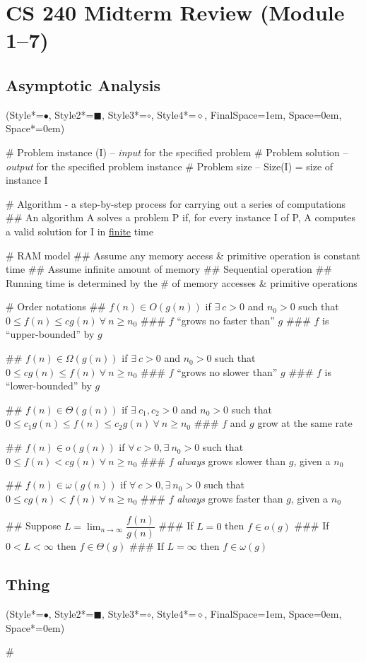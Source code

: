 \documentclass[11pt, oneside]{article}
\newcommand*{\begineasylist}{\begin{easylist}[itemize]\ListProperties(Style*=$\bullet$\quad, Style2*=\tiny$\blacksquare$\quad, Style3*=$\circ$\quad, Style4*=$\diamond$\quad, FinalSpace=1em, Space=0em, Space*=0em)}
\begin{document}
\section*{CS 240 Midterm Review (Module 1--7)}

\subsection*{Asymptotic Analysis}
\begineasylist

# Problem instance (I) -- \emph{input} for the specified problem
# Problem solution -- \emph{output} for the specified problem instance
# Problem size -- Size(I) = size of instance I

# Algorithm - a step-by-step process for carrying out a series of computations
## An algorithm A solves a problem P if, for every instance I of P, A computes a valid solution for I in \underline{finite} time

# RAM model
## Assume any memory access \& primitive operation is constant time
## Assume infinite amount of memory
## Sequential operation
## Running time is determined by the \# of memory accesses \& primitive operations

# Order notations
## \underline{$f(n) \in O(g(n))$} if $\exists \ c > 0$ and $n_0 > 0$ such that $0 \leq f(n) \leq cg(n) \ \forall \ n \geq n_0$
### $f$ ``grows no faster than'' $g$
### $f$ is ``upper-bounded'' by $g$

## \underline{$f(n) \in \Omega(g(n))$} if $\exists \ c > 0$ and $n_0 > 0$ such that $0 \leq cg(n) \leq f(n) \ \forall \ n \geq n_0$
### $f$ ``grows no slower than'' $g$
### $f$ is ``lower-bounded'' by $g$

## \underline{$f(n) \in \Theta(g(n))$} if $\exists \ c_1, c_2 > 0$ and $n_0 > 0$ such that $0 \leq c_1g(n) \leq f(n) \leq c_2g(n) \ \forall \ n \geq n_0$
### $f$ and $g$ grow at the same rate

## \underline{$f(n) \in o(g(n))$} if $\forall \ c > 0, \exists \ n_0 > 0$ such that $0 \leq f(n) < cg(n) \ \forall \ n \geq n_0$
### $f$ \emph{always} grows slower than $g$, given a $n_0$

## \underline{$f(n) \in \omega(g(n))$} if $\forall \ c > 0, \exists \ n_0 > 0$ such that $0 \leq cg(n) < f(n) \ \forall \ n \geq n_0$  
### $f$ \emph{always} grows faster than $g$, given a $n_0$

## Suppose $L = \lim_{n \rightarrow \infty} \dfrac{f(n)}{g(n)}$
### If $L = 0$ then $f \in o(g)$
### If $0 < L < \infty$ then $f \in \Theta(g)$
### If $L = \infty$ then $f \in \omega(g)$



\end{easylist}
\subsection*{Thing}
\begineasylist

#

\end{easylist}
\end{document}
